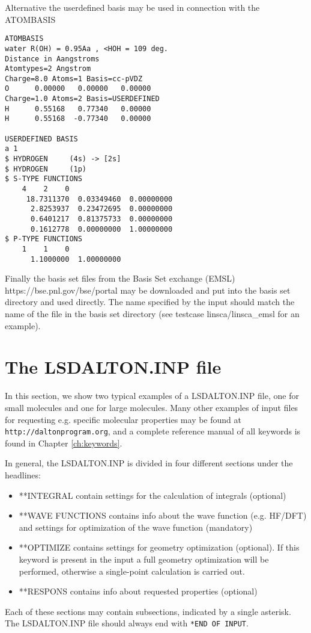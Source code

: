 Alternative the userdefined basis may be used in connection with the ATOMBASIS
\begin{verbatim}
ATOMBASIS
water R(OH) = 0.95Aa , <HOH = 109 deg.
Distance in Aangstroms
Atomtypes=2 Angstrom
Charge=8.0 Atoms=1 Basis=cc-pVDZ
O      0.00000   0.00000   0.00000
Charge=1.0 Atoms=2 Basis=USERDEFINED
H      0.55168   0.77340   0.00000
H      0.55168  -0.77340   0.00000

USERDEFINED BASIS
a 1
$ HYDROGEN     (4s) -> [2s]                                      
$ HYDROGEN     (1p)                                              
$ S-TYPE FUNCTIONS
    4    2    0
     18.7311370  0.03349460  0.00000000
      2.8253937  0.23472695  0.00000000
      0.6401217  0.81375733  0.00000000
      0.1612778  0.00000000  1.00000000
$ P-TYPE FUNCTIONS
    1    1    0
      1.1000000  1.00000000
\end{verbatim}

Finally the basis set files from the Basis Set exchange (EMSL) 
https://bse.pnl.gov/bse/portal may be downloaded and put into 
the basis set directory and used directly. The name specified by 
the input should match the name of the file in the basis set directory
(see testcase {linsca/linsca\_emsl} for an example).

\section{The LSDALTON.INP file}\label{sec:daltoninp}
In this section, we show two typical examples of a LSDALTON.INP file, one
for small molecules and one for large molecules. Many other examples
of input files for requesting e.g. specific molecular properties may be found
at \verb|http://daltonprogram.org|, and
a complete reference manual of all keywords is found in Chapter \ref{ch:keywords}.

In general, the LSDALTON.INP is divided in four different sections under
the headlines:
\begin{itemize}
\item **INTEGRAL contain settings for the calculation of integrals (optional)
\item **WAVE FUNCTIONS contains info about the wave function (e.g. HF/DFT) and settings
for optimization of the wave function (mandatory)
\item **OPTIMIZE contains settings for geometry optimization (optional). If this keyword
      is present in the input a full geometry optimization will be performed, otherwise a single-point 
      calculation is carried out.
\item **RESPONS contains info about requested properties (optional)
\end{itemize}
Each of these sections may contain subsections, indicated by a single asterisk.
The LSDALTON.INP file should always end with \verb|*END OF INPUT|. 


